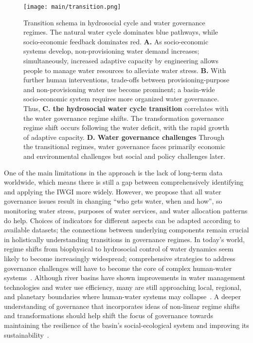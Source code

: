 \documentclass[draft]{agujournal2019}
\begin{document}
\begin{figure*}[htbp!]
	\centering
	\texttt{[image: main/transition.png]}
	\caption{
		Transition schema in hydrosocial cycle and water governance regimes. The natural water cycle dominates blue pathways, while socio-economic feedback dominates red.
		\textbf{A.} As socio-economic systems develop, non-provisioning water demand increases; simultaneously, increased adaptive capacity by engineering allows people to manage water resources to alleviate water stress.
		\textbf{B.} With further human interventions, trade-offs between provisioning-purpose and non-provisioning water use become prominent; a basin-wide socio-economic system requires more organized water governance.
		Thus, \textbf{C. the hydrosocial water cycle transition} correlates with the water governance regime shifts. The transformation governance regime shift occurs following the water deficit, with the rapid growth of adaptive capacity.
		\textbf{D. Water governance challenges} Through the transitional regimes, water governance faces primarily economic and environmental challenges but social and policy challenges later.
	}\label{fig:summary}
\end{figure*}


One of the main limitations in the approach is the lack of long-term data worldwide, which means there is still a gap between comprehensively identifying and applying the IWGI more widely.
However, we propose that all water governance issues result in changing ``who gets water, when and how'', so monitoring water stress, purposes of water services, and water allocation patterns do help.
Choices of indicators for different aspects can be adapted according to available datasets; the connections between underlying components remain crucial in holistically understanding transitions in governance regimes.
In today's world, regime shifts from biophysical to hydrosocial control of water dynamics seem likely to become increasingly widespread; comprehensive strategies to address governance challenges will have to become the core of complex human-water systems~\cite{cumming2018,cumming2014,jaeger2019}.
Although river basins have shown improvements in water management technologies and water use efficiency, many are still approaching local, regional, and planetary boundaries where human-water systems may collapse~\cite{gleeson2020, wang-erlandsson2022}.
A deeper understanding of governance that incorporates ideas of non-linear regime shifts and transformations should help shift the focus of governance towards maintaining the resilience of the basin’s social-ecological system and improving its sustainability~\cite{falkenmark2019}.
\end{document}
